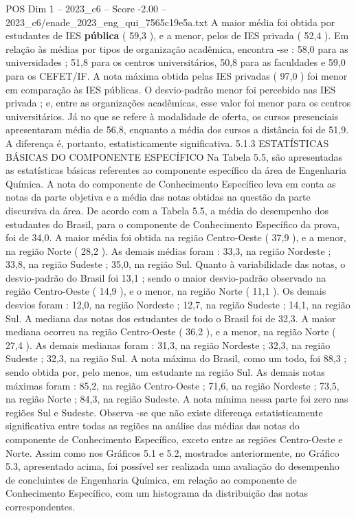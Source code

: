 \begin{textsample}{POS Dim 1 – 2023\_c6 – Score -2.00 – 2023\_c6/enade\_2023\_eng\_qui\_7565c19e5a.txt}
A maior média foi obtida por estudantes de IES \textbf{pública} ( 59,3 ), e a menor, pelos de IES privada ( 52,4 ).
Em relação às médias por tipos de organização acadêmica, encontra -se : 58,0 para as universidades ; 51,8 para os centros universitários, 50,8 para as faculdades e 59,0 para os CEFET/IF.
A nota máxima obtida pelas IES privadas ( 97,0 ) foi menor em comparação às IES públicas.
O desvio-padrão menor foi percebido nas IES privada ; e, entre as organizações acadêmicas, esse valor foi menor para os centros universitários.
Já no que se refere à modalidade de oferta, os cursos presenciais apresentaram média de 56,8, enquanto a média dos cursos a distância foi de 51,9.
A diferença é, portanto, estatisticamente significativa. 5.1.3 ESTATÍSTICAS BÁSICAS DO COMPONENTE ESPECÍFICO Na Tabela 5.5, são apresentadas as estatísticas básicas referentes ao componente específico da área de Engenharia Química.
A nota do componente de Conhecimento Específico leva em conta as notas da parte objetiva e a média das notas obtidas na questão da parte discursiva da área.
De acordo com a Tabela 5.5, a média do desempenho dos estudantes do Brasil, para o componente de Conhecimento Específico da prova, foi de 34,0.
A maior média foi obtida na região Centro-Oeste ( 37,9 ), e a menor, na região Norte ( 28,2 ).
As demais médias foram : 33,3, na região Nordeste ; 33,8, na região Sudeste ; 35,0, na região Sul.
Quanto à variabilidade das notas, o desvio-padrão do Brasil foi 13,1 ; sendo o maior desvio-padrão observado na região Centro-Oeste ( 14,9 ), e o menor, na região Norte ( 11,1 ).
Os demais desvios foram : 12,0, na região Nordeste ; 12,7, na região Sudeste ; 14,1, na região Sul.
A mediana das notas dos estudantes de todo o Brasil foi de 32,3.
A maior mediana ocorreu na região Centro-Oeste ( 36,2 ), e a menor, na região Norte ( 27,4 ).
As demais medianas foram : 31,3, na região Nordeste ; 32,3, na região Sudeste ; 32,3, na região Sul.
A nota máxima do Brasil, como um todo, foi 88,3 ; sendo obtida por, pelo menos, um estudante na região Sul.
As demais notas máximas foram : 85,2, na região Centro-Oeste ; 71,6, na região Nordeste ; 73,5, na região Norte ; 84,3, na região Sudeste.
A nota mínima nessa parte foi zero nas regiões Sul e Sudeste.
Observa -se que não existe diferença estatisticamente significativa entre todas as regiões na análise das médias das notas do componente de Conhecimento Específico, exceto entre as regiões Centro-Oeste e Norte.
Assim como nos Gráficos 5.1 e 5.2, mostrados anteriormente, no Gráfico 5.3, apresentado acima, foi possível ser realizada uma avaliação do desempenho de concluintes de Engenharia Química, em relação ao componente de Conhecimento Específico, com um histograma da distribuição das notas correspondentes.

\end{textsample}
